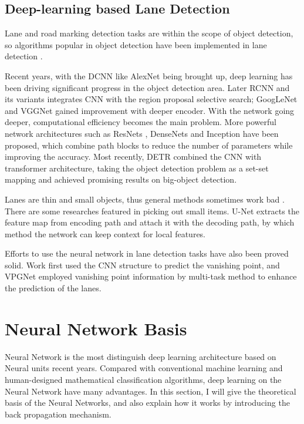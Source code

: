 \begin{spacing}{1.5}
\subsection{Deep-learning based Lane Detection}

Lane and road marking detection tasks are within the scope of object detection, so algorithms popular in object detection have been implemented in lane detection \cite{tang2020review}. 

Recent years, with the DCNN like AlexNet \cite{krizhevsky2012imagenet} being brought up, deep learning has been driving significant progress in the object detection area. Later RCNN and its variants \cite{girshick2014rich, girshick2015fast, ren2015faster} integrates CNN with the region proposal selective search; GoogLeNet \cite{szegedy2015going} and VGGNet \cite{simonyan2014very} gained improvement with deeper encoder. With the network going deeper, computational efficiency becomes the main problem. More powerful network architectures such as ResNets \cite{he2016deep}, DenseNets \cite{huang2017densely} and Inception \cite{ioffe2015batch} have been proposed, which combine path blocks to reduce the number of parameters while improving the accuracy. Most recently, DETR \cite{carion2020end} combined the CNN with transformer architecture, taking the object detection problem as a set-set mapping and achieved promising results on big-object detection.

Lanes are thin and small objects, thus general methods sometimes work bad \cite{tang2020review}. There are some researches featured in picking out small items. U-Net \cite{ronneberger2015unet} extracts the feature map from encoding path and attach it with the decoding path, by which method the network can keep context for local features.

Efforts to use the neural network in lane detection tasks have also been proved solid. Work \cite{borji2016vanishing} first used the CNN structure to predict the vanishing point, and VPGNet \cite{lee2017vpgnet} employed vanishing point information by multi-task method to enhance the prediction of the lanes.

\section{Neural Network Basis}

Neural Network is the most distinguish deep learning architecture based on Neural units recent years. Compared with conventional machine learning and human-designed mathematical classification algorithms, deep learning on the Neural Network have many advantages. In this section, I will give the theoretical basis of the Neural Networks, and also explain how it works by introducing the back propagation mechanism.


\end{spacing}

